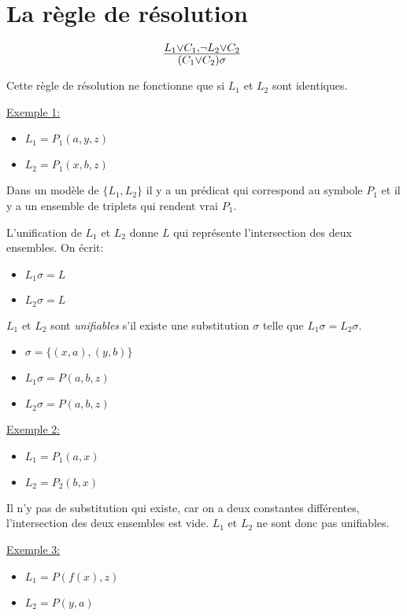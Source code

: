{\section{La règle de résolution}

$$ \mbox{\Large $\frac{L_1 \vee C_1, \neg L_2 \vee C_2}{(C_1 \vee C_2)\sigma}$ } $$

Cette règle de résolution ne fonctionne que si $L_1$ et $L_2$ sont identiques.

\underline{Exemple 1:}

\begin{itemize}
  \item $L_1 = P_1(a, y, z)$
  \item $L_2 = P_1(x, b, z)$
\end{itemize}

Dans un modèle de $\{L_1, L_2\}$
il y a un prédicat qui correspond au symbole $P_1$ et il y a un ensemble de triplets qui rendent vrai $P_1$.

L'unification de $L_1$ et $L_2$ donne $L$ qui représente l'intersection des deux ensembles. On écrit:
\begin{itemize}
  \item $L_1 \sigma = L$
  \item $L_2 \sigma = L$
\end{itemize}

\vspace{5 mm}
$L_1$ et $L_2$ sont {\em unifiables} s'il existe une substitution $\sigma$ telle que $L_1 \sigma = L_2 \sigma$.
\begin{itemize}
  \item $\sigma = \big\{(x,a),(y,b)\big\}$
  \item $L_1 \sigma = P(a,b,z)$
  \item $L_2 \sigma = P(a,b,z)$
\end{itemize}

\vspace{5 mm}
\underline{Exemple 2:}
\begin{itemize}
  \item $L_1 = P_1(a,x)$
  \item $L_2 = P_2(b,x)$
\end{itemize}
Il n'y pas de substitution qui existe, car on a deux constantes différentes, l'intersection des deux ensembles est vide.
$L_1$ et $L_2$ ne sont donc pas unifiables.
\smallskip

\underline{Exemple 3:}

\begin{itemize}
  \item $L_1 = P(f(x), z)$ 
  \item $L_2 = P(y, a)$
\end{itemize}

}
